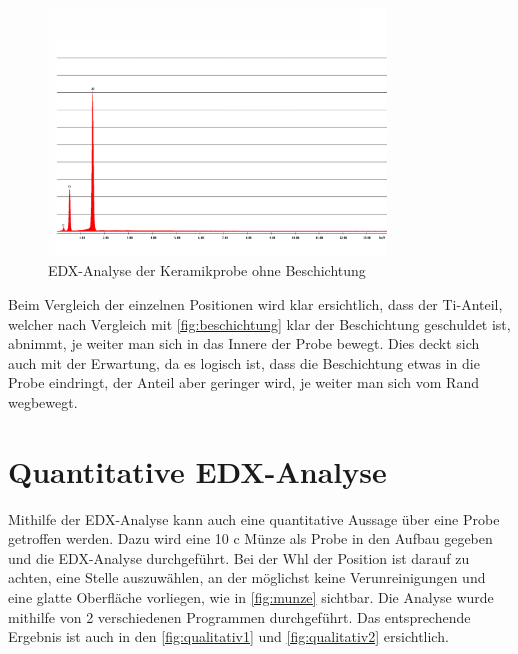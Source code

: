 \documentclass[12pt,english,ngerman]{scrartcl}
\begin{document}
\begin{figure}[H]
	\begin{center}
		\includegraphics[width =0.8\textwidth]{./figures/keramik.png}
	\end{center}
	\caption{EDX-Analyse der Keramikprobe ohne Beschichtung~\cite{sein_foto}
	}\label{fig:keramik}
\end{figure}

Beim Vergleich der einzelnen Positionen wird klar ersichtlich, dass der
Ti-Anteil, welcher nach Vergleich mit \autoref{fig:beschichtung} klar der
Beschichtung geschuldet ist, abnimmt, je weiter man sich in das Innere der
Probe bewegt. Dies deckt sich auch mit der Erwartung, da es logisch ist, dass
die Beschichtung etwas in die Probe eindringt, der Anteil aber geringer wird,
je weiter man sich vom Rand wegbewegt.

\section{Quantitative EDX-Analyse}

Mithilfe der EDX-Analyse kann auch eine quantitative Aussage über eine Probe
getroffen werden. Dazu wird eine 10 c Münze als Probe in den Aufbau gegeben und
die EDX-Analyse durchgeführt. Bei der Whl der Position ist darauf zu achten,
eine Stelle auszuwählen, an der möglichst keine Verunreinigungen und eine
glatte Oberfläche vorliegen, wie in \autoref{fig:munze} sichtbar. Die Analyse
wurde mithilfe von 2 verschiedenen Programmen durchgeführt. Das entsprechende
Ergebnis ist auch in den \autoref{fig:qualitativ1} und
\autoref{fig:qualitativ2} ersichtlich.
\end{document}
